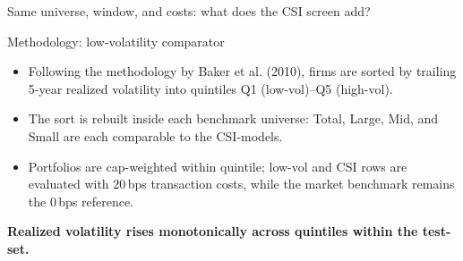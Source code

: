 \documentclass[10pt]{beamer}\usepackage[]{graphicx}\usepackage[table]{xcolor}
\begin{document}

\begin{frame}{Same universe, window, and costs: what does the CSI screen add?}
\scriptsize

\begin{alertblock}{Methodology: low-volatility comparator}
\scriptsize
\begin{itemize}\setlength\itemsep{1pt}
  \item Following the methodology by Baker et al. (2010), firms are sorted by trailing 5-year realized volatility into quintiles Q1 (low-vol)--Q5 (high-vol).
  \item The sort is rebuilt inside each benchmark universe: Total, Large, Mid, and Small are each comparable to the CSI-models.
  \item Portfolios are cap-weighted within quintile; low-vol and CSI rows are evaluated with 20\,bps transaction costs, while the market benchmark remains the 0\,bps reference.
\end{itemize}
\end{alertblock}

\vspace{0.25em}

\begin{center}
{\scriptsize\color{MainColour}\textbf{Realized volatility rises monotonically across quintiles within the test-set.}}\\[-0.2em]
\end{center}
\end{frame}
\end{document}
